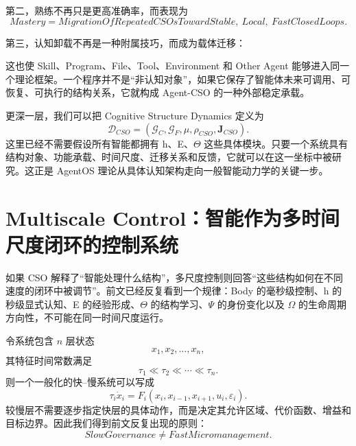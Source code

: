第二，熟练不再只是更高准确率，而表现为
\begin{equation}
\boxed{
Mastery
=
MigrationOfRepeatedCSOsToward
Stable,\ Local,\ FastClosedLoops.
}
\end{equation}

第三，认知卸载不再是一种附属技巧，而成为载体迁移：
\begin{statementbox}
\centering
{}
\end{statementbox}

这也使 Skill、Program、File、Tool、Environment 和 Other Agent 能够进入同一个理论框架。一个程序并不是“非认知对象”，如果它保存了智能体未来可调用、可恢复、可执行的结构关系，它就构成 Agent-CSO 的一种外部稳定承载。

更深一层，我们可以把 Cognitive Structure Dynamics 定义为
\begin{equation}
\boxed{
\mathcal{D}_{CSO}
=
\left(
\mathcal{G}_{C},
\mathcal{G}_{F},
\mu,
\rho_{CSO},
\mathbf{J}_{CSO}
\right).
}
\end{equation}
这里已经不需要假设所有智能都拥有 h、E、$\Theta$ 这些具体模块。只要一个系统具有结构对象、功能承载、时间尺度、迁移关系和反馈，它就可以在这一坐标中被研究。这正是 AgentOS 理论从具体认知架构走向一般智能动力学的关键一步。

\section{Multiscale Control：智能作为多时间尺度闭环的控制系统}

如果 CSO 解释了“智能处理什么结构”，多尺度控制则回答“这些结构如何在不同速度的闭环中被调节”。前文已经反复看到一个规律：Body 的毫秒级控制、h 的秒级显式认知、E 的经验形成、$\Theta$ 的结构学习、$\Psi$ 的身份变化以及 $\Omega$ 的生命周期方向性，不可能在同一时间尺度运行。

令系统包含 $n$ 层状态
\begin{equation}
x_1,x_2,\ldots,x_n,
\end{equation}
其特征时间常数满足
\begin{equation}
\tau_1\ll\tau_2\ll\cdots\ll\tau_n.
\end{equation}
则一个一般化的快--慢系统可以写成
\begin{equation}
\tau_i\dot{x}_i
=
F_i
\left(
x_i,
x_{i-1},
x_{i+1},
u_i,
\varepsilon_i
\right).
\end{equation}
较慢层不需要逐步指定快层的具体动作，而是决定其允许区域、代价函数、增益和目标边界。因此我们得到前文反复出现的原则：
\begin{equation}
\boxed{
SlowGovernance
\neq
FastMicromanagement.
}
\end{equation}

